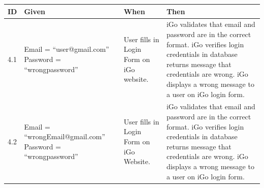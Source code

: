 \documentclass[11pt, english]{report}
\begin{document}
\setlength{\tabcolsep}{18pt}
\renewcommand{\arraystretch}{1.5}
\begin{tabular}{ |p{0.5cm}|p{3cm}|p{3.5cm}|p{5cm}| }
\hline
\textbf{ID} & \textbf{Given} & \textbf{When} & \textbf{Then}\\
\hline

4.1&
Email = “user@gmail.com”
Password = “wrongpassword”&
User fills in Login Form on iGo website.&
iGo validates that email and password are in the correct format.
iGo verifies login credentials in database returns message that credentials are wrong.
iGo displays a wrong message to a user on iGo login form.
 \\
\hline
4.2&
Email = “wrongEmail@gmail.com”
Password = “wrongpassword”&
User fills in Login Form on iGo Website.&
iGo validates that email and password are in the correct format.
iGo verifies login credentials in database returns message that credentials are wrong.
iGo displays a wrong message to a user on iGo login form.
 \\
\hline
\end{tabular}


\vspace*{0.2in}
\end{document}
